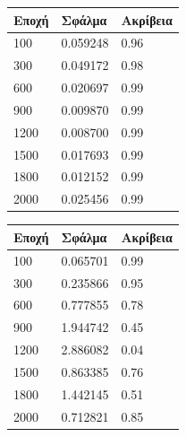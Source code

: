 \begin{center}
\begin{tabular}{|l|l|l|}
\hline
\textbf{Εποχή} & \textbf{Σφάλμα} & \textbf{Ακρίβεια} \\ \hline
100		   	   & 0.059248		 & 0.96            \\ \hline
300		       & 0.049172        & 0.98            \\ \hline
600  		   & 0.020697        & 0.99            \\ \hline
900	     	   & 0.009870        & 0.99            \\ \hline
1200		   & 0.008700        & 0.99            \\ \hline
1500		   & 0.017693        & 0.99            \\ \hline
1800		   & 0.012152        & 0.99            \\ \hline
2000		   & 0.025456        & 0.99            \\ \hline
\end{tabular}
\end{center}
 \label{tab:title}

\begin{center}
\begin{tabular}{|l|l|l|}
\hline
\textbf{Εποχή} & \textbf{Σφάλμα} & \textbf{Ακρίβεια} \\ \hline
100		   	   & 0.065701		 & 0.99            \\ \hline
300		       & 0.235866        & 0.95            \\ \hline
600  		   & 0.777855        & 0.78            \\ \hline
900	     	   & 1.944742        & 0.45            \\ \hline
1200		   & 2.886082        & 0.04            \\ \hline
1500		   & 0.863385        & 0.76            \\ \hline
1800		   & 1.442145        & 0.51            \\ \hline
2000		   & 0.712821        & 0.85            \\ \hline
\end{tabular}
\end{center}
 \label{tab:title}

